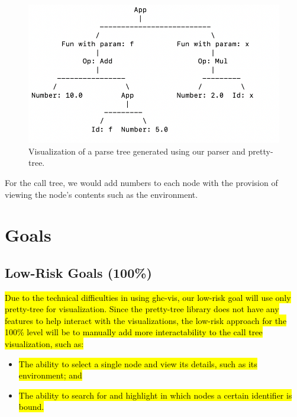 \documentclass[format=acmlarge, review=false, nonacm=false, screen=true]{acmart}
\begin{document}
\begin{figure}[H]
\includegraphics[width=\linewidth]{parseTreeViz.png}
\caption{Visualization of a parse tree generated using our parser and pretty-tree.\label{pretty-tree}}
\end{figure}

For the call tree, we would add numbers to each node with the provision of viewing the node's contents such as the environment.

\section{Goals}\label{stretch}
\subsection{Low-Risk Goals (100\%)}
\hl{Due to the technical difficulties in using ghc-vis, our low-risk goal will use only pretty-tree for visualization. Since the pretty-tree library does not have any features to help interact with the visualizations, the low-risk approach for the 100\% level will be to manually add more interactability to the call tree visualization, such as:}
        \begin{itemize}
            \item \hl{The ability to select a single node and view its details, such as its environment; and}
            \item \hl{The ability to search for and highlight in which nodes a certain identifier is bound.}
        \end{itemize}
\end{document}
